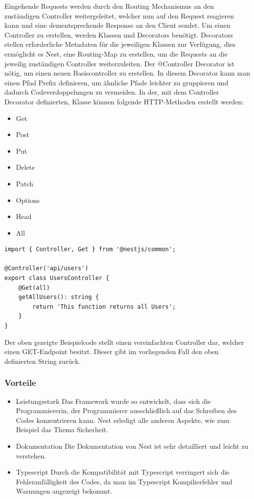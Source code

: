 Eingehende Requests werden durch den Routing Mechanismus an den zuständigen Controller weitergeleitet, welcher nun auf den Request reagieren kann und eine dementsprechende Response an den Client sendet. Um einen Controller zu erstellen, werden Klassen und Decorators benötigt. Decorators stellen erforderliche Metadaten für die jeweiligen Klassen zur Verfügung, dies ermöglicht es Nest, eine Routing-Map zu erstellen, um die Requests an die jeweilig zuständigen Controller weiterzuleiten.
\newline
Der @Controller Decorator ist nötig, um einen neuen Basiscontroller zu erstellen. In diesem Decorator kann man einen Pfad Prefix definieren, um ähnliche Pfade leichter zu gruppieren und dadurch Codeverdoppelungen zu vermeiden. In der, mit dem Controller Decorator definierten, Klasse können folgende HTTP-Methoden erstellt werden:

\begin{itemize}
    \item Get
    \item Post
    \item Put
    \item Delete
    \item Patch
    \item Options
    \item Head
    \item All
\end{itemize}

\begin{lstlisting}[caption=Simpler Controller]
import { Controller, Get } from '@nestjs/common';

@Controller('api/users')
export class UsersController {
    @Get(all)
    getAllUsers(): string {
        return 'This function returns all Users';
    }
}
\end{lstlisting}

Der oben gezeigte Beispielcode stellt einen vereinfachten Controller dar, welcher einen GET-Endpoint besitzt. Dieser gibt im vorliegenden Fall den oben definierten String zurück.
\cite{Nest_js_Controllers}


\subsubsection{Vorteile}
\begin{itemize}
    \item Leistungsstark
    \newline
    Das Framework wurde so entwickelt, dass sich die Programmiererin, der Programmierer ausschließlich auf das Schreiben des Codes konzentrieren kann. Nest erledigt alle anderen Aspekte, wie zum Beispiel das Thema Sicherheit.
    \item Dokumentation
    \newline
    Die Dokumentation von Nest ist sehr detailliert und leicht zu verstehen.
    \item Typescript
    \newline
    Durch die Kompatibilität mit Typescript verringert sich die Fehleranfälligkeit des Codes, da man im Typescript Kompilierfehler und Warnungen angezeigt bekommt.
\end{itemize}

